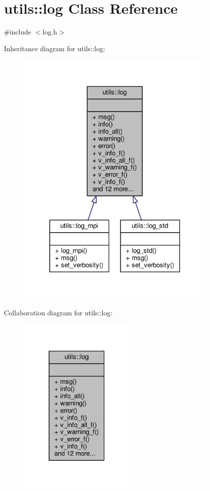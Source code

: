 \hypertarget{classutils_1_1log}{\section{utils\-:\-:log Class Reference}
\label{classutils_1_1log}
}


{\ttfamily \#include $<$log.\-h$>$}



Inheritance diagram for utils\-:\-:log\-:
\nopagebreak
\begin{figure}[H]
\begin{center}
\leavevmode
\includegraphics[width=278pt]{classutils_1_1log__inherit__graph}
\end{center}
\end{figure}


Collaboration diagram for utils\-:\-:log\-:
\nopagebreak
\begin{figure}[H]
\begin{center}
\leavevmode
\includegraphics[width=162pt]{classutils_1_1log__coll__graph}
\end{center}
\end{figure}
